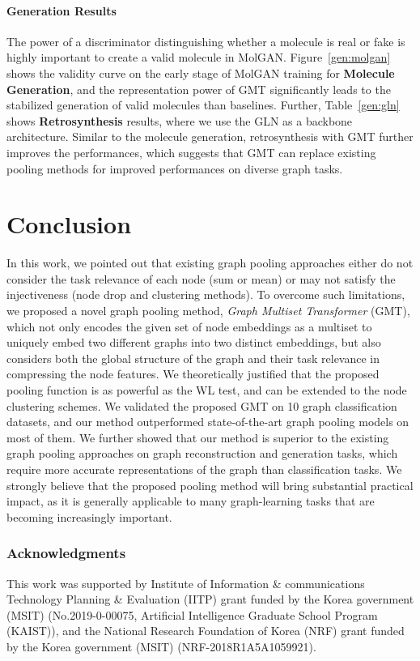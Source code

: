 \documentclass{article} \usepackage{iclr2021_conference,times}
\begin{document}
 
\vspace{-0.075in}
\paragraph{Generation Results}
The power of a discriminator distinguishing whether a molecule is real or fake is highly important to create a valid molecule in MolGAN. Figure~\ref{gen:molgan} shows the validity curve on the early stage of MolGAN training for \textbf{Molecule Generation}, and the representation power of GMT significantly leads to the stabilized generation of valid molecules than baselines. Further, Table~\ref{gen:gln} shows \textbf{Retrosynthesis} results, where we use the GLN as a backbone architecture. Similar to the molecule generation, retrosynthesis with GMT further improves the performances, which suggests that GMT can replace existing pooling methods for improved performances on diverse graph tasks.
 \vspace{-0.15in}
\section{Conclusion}
\vspace{-0.075in}
In this work, we pointed out that existing graph pooling approaches either do not consider the task relevance of each node (sum or mean) or may not satisfy the injectiveness (node drop and clustering methods). To overcome such limitations, we proposed a novel graph pooling method, \emph{Graph Multiset Transformer} (GMT), which not only encodes the given set of node embeddings as a multiset to uniquely embed two different graphs into two distinct embeddings, but also considers both the global structure of the graph and their task relevance in compressing the node features. We theoretically justified that the proposed pooling function is as powerful as the WL test, and can be extended to the node clustering schemes. We validated the proposed GMT on 10 graph classification datasets, and our method outperformed state-of-the-art graph pooling models on most of them. We further showed that our method is superior to the existing graph pooling approaches on graph reconstruction and generation tasks, which require more accurate representations of the graph than classification tasks. We strongly believe that the proposed pooling method will bring substantial practical impact, as it is generally applicable to many graph-learning tasks that are becoming increasingly important. 

\subsubsection*{Acknowledgments}
\vspace{-0.05in}
This work was supported by Institute of Information \& communications Technology Planning \& Evaluation (IITP) grant funded by the Korea government (MSIT) (No.2019-0-00075, Artificial Intelligence Graduate School Program (KAIST)), and the National Research Foundation of Korea (NRF) grant funded by the Korea government (MSIT) (NRF-2018R1A5A1059921).
 
\end{document}
